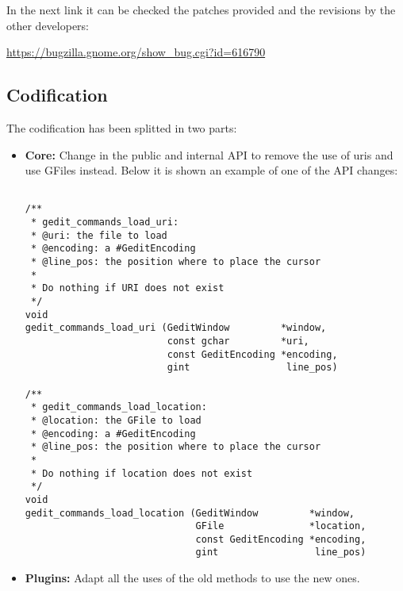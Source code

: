 In the next link it can be checked the patches provided and the revisions by the other developers:

\noindent\url{https://bugzilla.gnome.org/show_bug.cgi?id=616790}

\subsection{Codification}

The codification has been splitted in two parts:
\begin{itemize}
  \item \textbf{Core:} Change in the public and internal API to remove the use of uris and use GFiles instead. Below it is shown an example of one of the API changes:

    \begin{lstlisting}[style=C]

/**
 * gedit_commands_load_uri:
 * @uri: the file to load
 * @encoding: a #GeditEncoding
 * @line_pos: the position where to place the cursor
 *
 * Do nothing if URI does not exist
 */
void
gedit_commands_load_uri (GeditWindow         *window,
                         const gchar         *uri,
                         const GeditEncoding *encoding,
                         gint                 line_pos)

/**
 * gedit_commands_load_location:
 * @location: the GFile to load
 * @encoding: a #GeditEncoding
 * @line_pos: the position where to place the cursor
 *
 * Do nothing if location does not exist
 */
void
gedit_commands_load_location (GeditWindow         *window,
                              GFile               *location,
                              const GeditEncoding *encoding,
                              gint                 line_pos)

    \end{lstlisting}

  \item \textbf{Plugins:} Adapt all the uses of the old methods to use the new ones.
\end{itemize}

